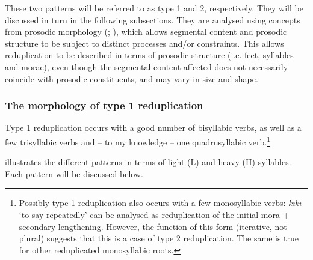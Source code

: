 These two patterns will be referred to as type 1 and 2, respectively. They will be discussed in turn in the following subsections. They are analysed using concepts from prosodic morphology (\citealt{McCarthyPrince1995,McCarthyPrince1996}; \citealt{InkelasZec1995}), which allows segmental content and prosodic structure to be subject to distinct processes and/or constraints. This allows reduplication to be described in terms of prosodic structure (i.e. feet, syllables and morae), even though the segmental content affected does not necessarily coincide with prosodic constituents, and may vary in size and shape.

\subsubsection[The morphology of type 1 reduplication]{The morphology of type 1 reduplication}\label{sec:2.6.1.1}
Type 1 reduplication occurs with a good number of bisyllabic verbs, as well as a few trisyllabic verbs and – to my knowledge – one quadrusyllabic verb.\footnote{\label{fn:72}Possibly type 1 reduplication also occurs with a few monosyllabic verbs: \textit{kīkī} ‘to say repeatedly’ can be analysed as reduplication of the initial mora + secondary lengthening. However, the function of this form (iterative, not plural) suggests that this is a case of type 2 reduplication. The same is true for other reduplicated monosyllabic roots.} 

 illustrates the different patterns in terms of light (L) and heavy (H) syllables. Each pattern will be discussed below.

